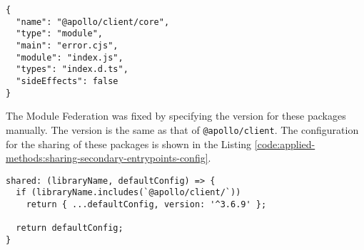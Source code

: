 \ifshowListings
\begin{listing}[H]
  \begin{verbatim}
{
  "name": "@apollo/client/core",
  "type": "module",
  "main": "error.cjs",
  "module": "index.js",
  "types": "index.d.ts",
  "sideEffects": false
}
    \end{verbatim}
    \caption{The \texttt{package.json} of \texttt{@apollo/client/core}.}\label{code:applied-methods:package-json-apollo-client-core}
\end{listing}
\fi

\noindent The Module Federation was fixed by specifying the version for these packages manually. The version is the same as that of \texttt{@apollo/client}. The configuration for the sharing of these packages is shown in the Listing \ref{code:applied-methods:sharing-secondary-entrypoints-config}. 

\ifshowListings
\begin{listing}[H]
  \begin{verbatim}
shared: (libraryName, defaultConfig) => {
  if (libraryName.includes(`@apollo/client/`))
    return { ...defaultConfig, version: '^3.6.9' };

  return defaultConfig;
}
    \end{verbatim}
    \caption{Specifying the version for the secondary entry points for the \texttt{@apollo/client} package.}\label{code:applied-methods:sharing-secondary-entrypoints-config}
\end{listing}
\fi
